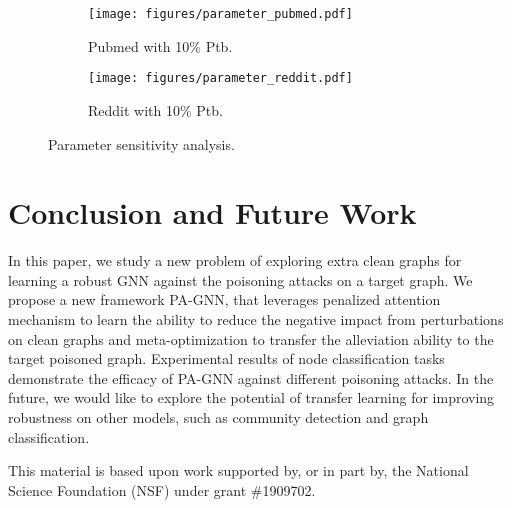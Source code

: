 \documentclass[sigconf]{acmart}
\newcommand{\our}{{PA-GNN}\xspace}
\newcommand{\ours}{{PA-GNN}\xspace}
\begin{document}
\begin{figure}[h]
    \centering
\begin{subfigure}{.2\textwidth}
      \centering
      \texttt{[image: figures/parameter\_pubmed.pdf]}
\caption{Pubmed with 10\% Ptb.}
      \label{fig:para_pubmed}
    \end{subfigure} \quad
    \begin{subfigure}{.2\textwidth}
      \centering
      \texttt{[image: figures/parameter\_reddit.pdf]}
\caption{Reddit with 10\% Ptb.}
      \label{fig:para_reddit}
    \end{subfigure}
\caption{Parameter sensitivity analysis.}
    \label{fig:para}
\end{figure}



 \section{Conclusion and Future Work}
In this paper, we study a new problem of exploring extra clean graphs for learning a robust GNN against the poisoning attacks on a target graph. We propose a new framework \our, that leverages penalized attention mechanism to learn the ability to reduce the negative impact from perturbations on clean graphs and meta-optimization to transfer the alleviation ability to the target poisoned graph. Experimental results of node classification tasks demonstrate the efficacy of \ours against different poisoning attacks. In the future, we would like to explore the potential of transfer learning for improving robustness on other models, such as community detection and graph classification.
 
\begin{acks}
This material is based upon work supported by, or in part by, the National Science Foundation (NSF) under grant \#1909702.
\end{acks}




\end{document}
